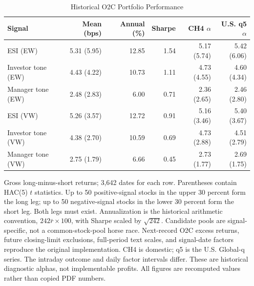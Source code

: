 \begin{table}[H]
\centering\footnotesize
\caption{Historical O2C Portfolio Performance}\label{tab:horse_race}
\begin{threeparttable}
\renewcommand{\arraystretch}{1.12}
\begin{tabular*}{\textwidth}{@{\extracolsep{\fill}}lrrrrr@{}}
\toprule
Signal & Mean (bps) & Annual (\%) & Sharpe & CH4 $\alpha$ & U.S. q5 $\alpha$ \\
\midrule
ESI (EW) & 5.31 (5.95) & 12.85 & 1.54 & 5.17 (5.74) & 5.42 (6.06) \\
Investor tone (EW) & 4.43 (4.22) & 10.73 & 1.11 & 4.73 (4.55) & 4.60 (4.34) \\
Manager tone (EW) & 2.48 (2.83) & 6.00 & 0.71 & 2.36 (2.65) & 2.46 (2.80) \\
ESI (VW) & 5.26 (3.57) & 12.72 & 0.91 & 5.16 (3.46) & 5.40 (3.67) \\
Investor tone (VW) & 4.38 (2.70) & 10.59 & 0.69 & 4.73 (2.88) & 4.51 (2.79) \\
Manager tone (VW) & 2.75 (1.79) & 6.66 & 0.45 & 2.73 (1.77) & 2.69 (1.75) \\
\bottomrule
\end{tabular*}
\begin{tablenoteblock}
Gross long-minus-short returns; 3,642 dates for each row. Parentheses contain HAC(5) $t$ statistics. Up to 50 positive-signal stocks in the upper 30 percent form the long leg; up to 50 negative-signal stocks in the lower 30 percent form the short leg. Both legs must exist. Annualization is the historical arithmetic convention, $242\bar r\times100$, with Sharpe scaled by $\sqrt{242}$. Candidate pools are signal-specific, not a common-stock-pool horse race. Next-record O2C excess returns, future closing-limit exclusions, full-period text scales, and signal-date factors reproduce the original implementation. CH4 is domestic; q5 is the U.S. Global-q series. The intraday outcome and daily factor intervals differ. These are historical diagnostic alphas, not implementable profits. All figures are recomputed values rather than copied PDF numbers.
\end{tablenoteblock}
\end{threeparttable}
\end{table}
